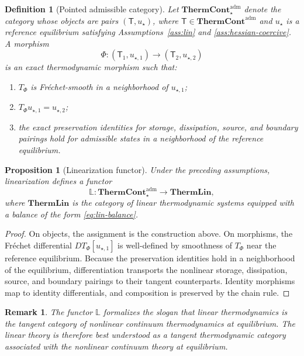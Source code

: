 \documentclass[11pt]{article}
\newtheorem{proposition}[theorem]{Proposition}
\newtheorem{definition}[theorem]{Definition}
\newtheorem{remark}[theorem]{Remark}
\newcommand{\ThermAdm}{\mathbf{ThermCont}^{\mathrm{adm}}}
\newcommand{\ThermLin}{\mathbf{ThermLin}}
\begin{document}
\begin{definition}[Pointed admissible category]
Let \(\ThermAdm_\star\) denote the category whose objects are pairs
\((\mathsf{T},u_\star)\), where \(\mathsf{T}\in\ThermAdm\) and \(u_\star\) is a
reference equilibrium satisfying Assumptions~\ref{ass:lin} and
\ref{ass:hessian-coercive}. A morphism
\[
\Phi:(\mathsf{T}_1,u_{\star,1})\to(\mathsf{T}_2,u_{\star,2})
\]
is an exact thermodynamic morphism such that:
\begin{enumerate}[label=(\roman*),leftmargin=1.1cm]
    \item \(T_\Phi\) is Fr\'echet-smooth in a neighborhood of \(u_{\star,1}\);
    \item \(T_\Phi u_{\star,1}=u_{\star,2}\);
    \item the exact preservation identities for storage, dissipation, source, and
    boundary pairings hold for admissible states in a neighborhood of the reference
    equilibrium.
\end{enumerate}
\end{definition}

\begin{proposition}[Linearization functor]
Under the preceding assumptions, linearization defines a functor
\[
\mathbb{L}:\ThermAdm_\star\to \ThermLin,
\]
where \(\ThermLin\) is the category of linear thermodynamic systems equipped with a
balance of the form \eqref{eq:lin-balance}.
\end{proposition}

\begin{proof}
On objects, the assignment is the construction above. On morphisms, the Fr\'echet
differential \(DT_\Phi[u_{\star,1}]\) is well-defined by smoothness of \(T_\Phi\) near
the reference equilibrium. Because the preservation identities hold in a neighborhood
of the equilibrium, differentiation transports the nonlinear storage, dissipation,
source, and boundary pairings to their tangent counterparts. Identity morphisms map
to identity differentials, and composition is preserved by the chain rule.
\end{proof}

\begin{remark}
The functor \(\mathbb{L}\) formalizes the slogan that linear thermodynamics is the
tangent category of nonlinear continuum thermodynamics at equilibrium. The linear
theory is therefore best understood as a tangent thermodynamic category associated
with the nonlinear continuum theory at equilibrium.
\end{remark}
\end{document}
